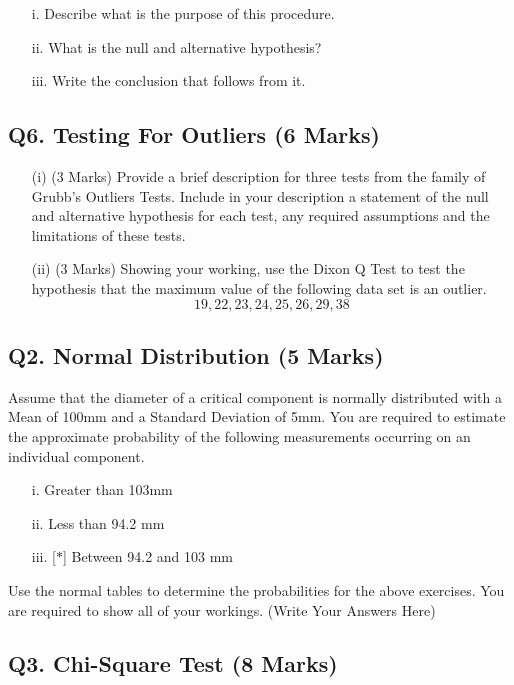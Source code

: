 \documentclass[a4paper,12pt]{article}
\begin{document}
\begin{itemize}
	\item[i.]  Describe what is the purpose of this procedure.
	\item[ii.]  What is the null and alternative hypothesis?
	\item[iii.]  Write the conclusion that follows from it.
\end{itemize}

\subsection*{Q6. Testing For Outliers (6 Marks)}
\begin{itemize}
	\item[(i)] (3 Marks) Provide a brief description for three tests from the family of Grubb's  Outliers Tests. Include in your description a statement of the null and alternative hypothesis for each test, any required assumptions and the limitations of these tests.
	\item[(ii)] (3 Marks) Showing your working, use the Dixon Q Test to test the hypothesis that the maximum value of the following data set is an outlier.
	\[ 19,22,23,24,25,26,29,38\]
\end{itemize}
\newpage
\subsection*{Q2. Normal Distribution (5 Marks)} %
Assume that the diameter of a critical component is normally distributed with a Mean of 100mm and a Standard Deviation of 5mm. You are required  to estimate the approximate probability of the following measurements occurring on an individual component.
\begin{itemize}
	\item [i.]	Greater than 103mm
	\item [ii.] Less than 94.2 mm
	\item [iii.][$\ast$] Between 94.2 and 103 mm
\end{itemize}
\bigskip
\noindent Use the normal tables to determine the probabilities for the above exercises. You are required to show all of your workings.
\newpage
(Write Your Answers Here)
\newpage

\subsection*{Q3. Chi-Square Test (8 Marks)} %
\end{document}
